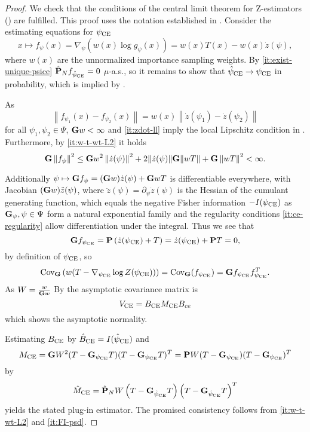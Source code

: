 \begin{proof} We check that the conditions of the central limit theorem for Z-estimators () are fulfilled. This proof uses the notation established in . Consider the estimating equations for ${\psi_{\text{CE}}}$ 
    $$x\mapsto f_\psi(x) = \nabla_{\psi} \left(w(x)\log g_{\psi}(x)\right) = w(x) T(x) - w(x) \dot z (\psi),$$ where $w(x)$ are the unnormalized importance sampling weights. 
    By \ref{it:exist-unique-psice} $\hat {\mathbf P}_{N} f_{{\hat\psi_{\text{CE}}}} = 0$ $\mu$-a.s., so it remains to show that ${\hat\psi_{\text{CE}}} \to {\ensuremath{\psi_{\text{CE}}}}$  in probability, which is implied by  .
    
    As $$\left\lVert f_{\psi_1}(x) - f_{\psi_2}(x)\right\rVert = w(x) \left\lVert \dot z (\psi_1) - \dot z(\psi_2)\right\rVert$$ for all $\psi_{1}, \psi_{2}\in \Psi$,  $\mathbf G w < \infty $ and \ref{it:zdot-ll} imply the local Lipschitz condition  in .
    Furthermore, by \ref{it:w-t-wt-L2} it holds
    $$
    \mathbf G \left\lVert f_\psi \right\rVert^2 \leq \mathbf G w^2 \left\lVert \dot z(\psi) \right\rVert ^2  + 2 \lVert \dot z(\psi) \rVert \mathbf G \lVert wT\rVert + \mathbf G \left\lVert wT\right\rVert^2 < \infty.
    $$

    Additionally $\psi \mapsto\mathbf G f_\psi = (\mathbf G w) \dot z (\psi) + \mathbf G wT$ is differentiable everywhere, with Jacobian $(\mathbf G w) \ddot z(\psi)$, where  $\ddot z(\psi) = \partial_\psi \dot z(\psi)$ is the Hessian of the cumulant generating function, which equals the negative Fisher information $-I({\psi_{\text{CE}}})$ as $\mathbf G_{\psi}, \psi \in \Psi$ form a natural exponential family and the regularity conditions \ref{it:ce-regularity} allow differentiation under the integral.
    Thus we see that 
    $$
    \mathbf G f_{{\psi_{\text{CE}}}} = \mathbf P \left( \dot z({\psi_{\text{CE}}}) + T \right) = \dot z ({\psi_{\text{CE}}}) + \mathbf P T = 0,
    $$
    by definition of ${\psi_{\text{CE}}}$, so $$\text{Cov}_{\mathbf G} \left( w(T - \nabla_{{\psi_{\text{CE}}}} \log Z ({\psi_{\text{CE}}})) \right) = \text{Cov}_{\mathbf G}(f_{{\psi_{\text{CE}}}}) = \mathbf G f_{{\psi_{\text{CE}}}}f_{{\psi_{\text{CE}}}}^{T}.$$
    As $W = \frac{w}{\mathbf G w}$
    By  the asymptotic covariance matrix is 
    $$
    V_{{\text{CE}}} = B_{{\text{CE}}}M_{{\text{CE}}}B_{ce}
    $$
    which shows the asymptotic normality. 

    Estimating $B_{{\text{CE}}}$ by $\hat B_{{\text{CE}}}= I({\hat\psi_{\text{CE}}})$ and $$M_{{\text{CE}}} = \mathbf G W^{2} (T - \mathbf G_{{\psi_{\text{CE}}}}T)(T - \mathbf G_{{\psi_{\text{CE}}}}T)^{T} = \mathbf P W (T - \mathbf G_{{\psi_{\text{CE}}}})(T - \mathbf G_{{\psi_{\text{CE}}}})^T$$ by $$\hat M_{{\text{CE}}} = \hat{\mathbf P}_{N} W \left( T - \mathbf G_{{\hat\psi_{\text{CE}}}} T \right)\left( T - \mathbf G_{{\hat\psi_{\text{CE}}}} T \right)^{T}$$
    yields the stated plug-in estimator. 
    The promised consistency follows from \ref{it:w-t-wt-L2} and \ref{it:FI-psd}.
\end{proof}


